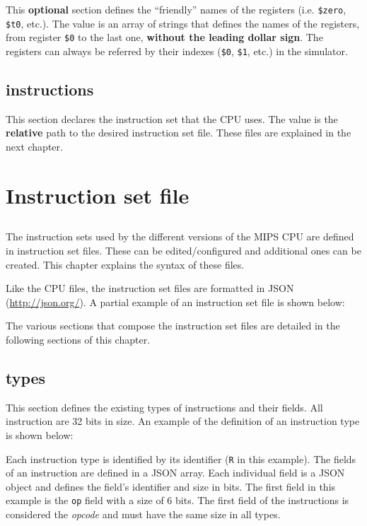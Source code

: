 \documentclass[11pt,a4paper,twoside,titlepage]{report}
\begin{document}
This \textbf{optional} section defines the ``friendly'' names of the registers (i.e.
\verb+$zero+, \verb+$t0+, etc.).
The value is an array of strings that defines the names of the registers, from
register \verb+$0+ to the last one, \textbf{without the leading dollar sign}.
The registers can always be referred by their indexes (\verb+$0+, \verb+$1+, etc.) 
in the simulator.


\section{instructions}

This section declares the instruction set that the CPU uses.
The value is the \textbf{relative} path to the desired instruction set file.
These files are explained in the next chapter.


\chapter{Instruction set file}

\section*{}

The instruction sets used by the different versions of the MIPS CPU
are defined in instruction set files.
These can be edited/configured and additional ones can be created.
This chapter explains the syntax of these files.

Like the CPU files, the instruction set files are formatted in 
JSON (\url{http://json.org/}).
A partial example of an instruction set file is shown below:



The various sections that compose the instruction set files are detailed in 
the following sections of this chapter.


\section{types}

This section defines the existing types of instructions and their fields.
All instruction are 32 bits in size.
An example of the definition of an instruction type is shown below:



Each instruction type is identified by its identifier (\verb+R+ in this example).
The fields of an instruction are defined in a JSON array. Each individual field is 
a JSON object and defines the field's identifier and size in bits. The first field
in this example is the \verb+op+ field with a size of 6 bits.
The first field of the instructions is considered the \emph{opcode} and must
have the same size in all types.
\end{document}
